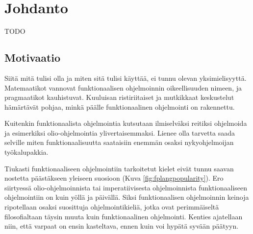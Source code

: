 
\chapter{Johdanto}

TODO

\section{Motivaatio}

Siitä mitä  tulisi olla ja miten sitä tulisi käyttää, ei tunnu olevan yksimielisyyttä. Matemaatikot vannovat funktionaalisen ohjelmoinnin oikeellisuuden nimeen, ja pragmaatikot kauhistuvat. Kuuluisan ristiriitaiset ja mutkikkaat keskustelut hämärtävät pohjaa, minkä päälle funktionaalinen ohjelmointi on rakennettu. \cite{stackoverflow_what_monad,stackoverflow:why_monad}

Kuitenkin funktionaalista ohjelmointia kutsutaan ilmiselväksi reitiksi ohjelmoida ja esimerkiksi olio-ohjelmointia ylivertaisemmaksi. \cite[1]{the_oo_way} Lienee olla tarvetta saada selville miten funktionaalisuutta saataisiin enemmän osaksi nykyohjelmoijan työkalupakkia.

Tiukasti funktionaaliseen ohjelmointiin tarkoitetut kielet eivät tunnu saavan nostetta päästäkseen yleiseen suosioon (Kuva \ref{fig:fplangpopularity}). Ero siirtyessä olio-ohjelmoinnista tai imperatiivisesta ohjelmoinnista funktionaaliseen ohjelmointiin on kuin yöllä ja päivällä. Siksi funktionaalisen ohjelmoinnin keinoja ripotellaan osaksi suosittuja ohjelmointikieliä, jotka ovat perimmäiseltä filosofialtaan täysin muuta kuin funktionaalinen ohjelmointi. Kenties ajatellaan niin, että varpaat on ensin kasteltava, ennen kuin voi hypätä syvään päätyyn.

